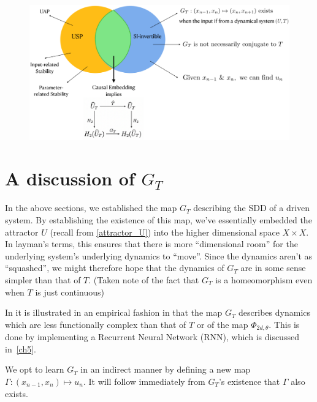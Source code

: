 \documentclass[a4paper,12pt,twoside]{report}
\begin{document}
\begin{figure}[ht]
  \includegraphics[scale=0.3]{_summarypictorial.eps}
  \centering
  \label{fig:fig_pictorialSummary}
\end{figure}

\section{A discussion of $G_T$ }

In the above sections, we established the map $G_T$ describing the SDD of a driven system. By establishing the existence of this map, we’ve essentially embedded the attractor $U$ (recall from \ref{attractor_U}) into the higher dimensional space $X\times{X}$.
In layman’s terms, this ensures that there is more “dimensional room” for the underlying system’s underlying dynamics to “move”. Since the dynamics aren’t as “squashed”, we might therefore hope that the dynamics of $G_T$ are in some sense simpler than that of $T$. (Taken note of the fact that $G_T$ is a homeomorphism even when $T$ is just continuous)
 
In \cite{manjunath2021universal} it is illustrated in an empirical fashion in that the map $G_T$ describes dynamics which are less functionally complex than that of $T$ or of the map $\Phi_{2d,\theta}$. This is done by implementing a Recurrent Neural Network (RNN), which is discussed in~\ref{ch5}. 
 
We opt to learn $G_T$ in an indirect manner by defining a new map $\Gamma:(x_{n-1},x_n)\mapsto{u_n}$. It will follow immediately from $G_T$’s existence that $\Gamma$ also exists. 
\end{document}
